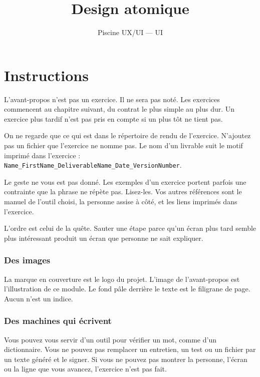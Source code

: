 \documentclass{training}
\begin{document}
\title{Design atomique}
\subtitle{Piscine UX/UI --- UI}
\maketitle

\newpage
\tableofcontents
\newpage


\chapter{Instructions}

L'avant-propos n'est pas un exercice. Il ne sera pas noté. Les exercices commencent au chapitre suivant, du contrat le plus simple au plus dur. Un exercice plus tardif n'est pas pris en compte si un plus tôt ne tient pas.

On ne regarde que ce qui est dans le répertoire de rendu de l'exercice. N'ajoutez pas un fichier que l'exercice ne nomme pas. Le nom d'un livrable suit le motif imprimé dans l'exercice : \texttt{Name\_FirstName\_DeliverableName\_Date\_VersionNumber}.

Le geste ne vous est pas donné. Les exemples d'un exercice portent parfois une contrainte que la phrase ne répète pas. Lisez-les. Vos autres références sont le manuel de l'outil choisi, la personne assise à côté, et les liens imprimés dans l'exercice.

L'ordre est celui de la quête. Sauter une étape parce qu'un écran plus tard semble plus intéressant produit un écran que personne ne sait expliquer.

\subsection*{Des images}

La marque en couverture est le logo du projet. L'image de l'avant-propos est l'illustration de ce module. Le fond pâle derrière le texte est le filigrane de page. Aucun n'est un indice.

\subsection*{Des machines qui écrivent}

Vous pouvez vous servir d'un outil pour vérifier un mot, comme d'un dictionnaire. Vous ne pouvez pas remplacer un entretien, un test ou un fichier par un texte généré et le signer. Si vous ne pouvez pas montrer la personne, l'écran ou la ligne que vous avancez, l'exercice n'est pas fait.
\end{document}

